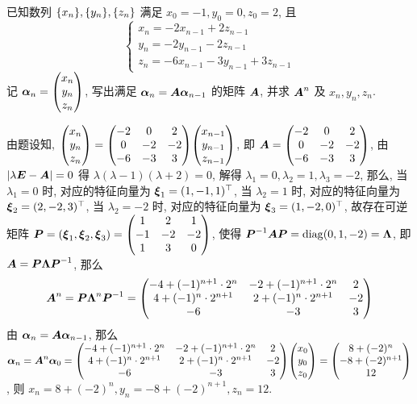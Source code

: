 \begin{example}[2024 数一]
    已知数列 $\qty{x_n},\qty{y_n},\qty{z_n}$ 满足 $x_0=-1,y_0=0,z_0=2$, 且 $$\begin{cases}
            x_n=-2x_{n-1}+2z_{n-1} \\
            y_n=-2y_{n-1}-2z_{n-1} \\
            z_n=-6x_{n-1}-3y_{n-1}+3z_{n-1}
        \end{cases}$$ 记 $\vb*{\alpha}_n=\mqty(x_n\\y_n\\z_n)$, 写出满足 $\vb*{\alpha}_n=\vb*{A\alpha}_{n-1}$ 的矩阵 $\vb*{A}$, 并求 $\vb*{A}^n$ 及 $x_n,y_n,z_n$.
\end{example}
\begin{solution}
    由题设知, $\mqty(x_n\\y_n\\z_n)=\mqty(-2&0&2\\0&-2&-2\\-6&-3&3)\mqty(x_{n-1}\\y_{n-1}\\z_{n-1})$, 即 $\vb*{A}=\mqty(-2&0&2\\0&-2&-2\\-6&-3&3)$, 
    由 $|\lambda\vb*{E}-\vb*{A}|=0$ 得 $\lambda(\lambda-1)(\lambda+2)=0$, 解得 $\lambda_1=0,\lambda_2=1,\lambda_3=-2$, 那么, 当 $\lambda_1=0$ 时, 对应的特征向量为 $\vb*{\xi}_1=(1,-1,1)^\top$, 
    当 $\lambda_2=1$ 时, 对应的特征向量为 $\vb*{\xi}_2=(2,-2,3)^\top$, 当 $\lambda_2=-2$ 时, 对应的特征向量为 $\vb*{\xi}_3=(1,-2,0)^\top$, 
    故存在可逆矩阵 $\vb*{P}=(\vb*{\xi}_1,\vb*{\xi}_2,\vb*{\xi}_3)=\mqty(1&2&1\\-1&-2&-2\\1&3&0)$, 使得 $\vb*{P}^{-1}\vb*{AP}=\mathrm{diag}(0,1,-2)=\vb*{\Lambda}$, 即 $\vb*{A}=\vb*{P\Lambda P}^{-1}$, 那么 
    $$\vb*{A}^n=\vb*{P}\vb*{\Lambda}^{n}\vb*{P}^{-1}=\mqty(-4+(-1)^{n+1}\cdot 2^{n}& -2+(-1)^{n+1}\cdot 2^{n}& 2\\4+(-1)^{n}\cdot 2^{n+1}& 2+(-1)^{n}\cdot 2^{n+1}&-2\\-6&-3&3)$$
    由 $\vb*{\alpha}_n=\vb*{A\alpha}_{n-1}$, 那么 $\vb*{\alpha}_n=\vb*{A}^n\vb*{\alpha}_0=\mqty(-4+(-1)^{n+1}\cdot 2^{n}& -2+(-1)^{n+1}\cdot 2^{n}& 2\\4+(-1)^{n}\cdot 2^{n+1}& 2+(-1)^{n}\cdot 2^{n+1}&-2\\-6&-3&3)\mqty(x_0\\y_0\\z_0)=\mqty(8+(-2)^{n}\\-8+(-2)^{n+1}\\12)$, 
    则 $x_n=8+(-2)^{n},y_n=-8+(-2)^{n+1},z_n=12.$
\end{solution}

